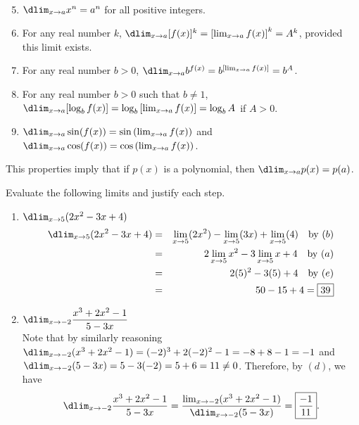 \documentclass{book}
\begin{document}
\begin{Thm}\mbox{}\\
\begin{enumerate}
\setcounter{enumi}{4}
\item $\dlim_{x\to a} x^n = a^n$ for all positive integers.\\ 


\item For any real number $k$, $\dlim_{x\to a}[f(x)]^k = \left[\lim_{x\to a}f(x)\right]^k = A^k$, provided this limit exists.\footnotemark\\

\item For any real number $b> 0$, $\dlim_{x\to a} b^{f(x)} = b^{\left[\lim_{x\to a} f(x)\right]} = b^A$.\\

\item For any real number $b> 0$ such that $b\neq 1$, $\dlim_{x\to a}[\log_b f(x)] = \log_b\left[\lim_{x\to a} f(x)\right] = \log_b A$ if $A> 0$.\\

\item $\dlim_{x\to a} \sin (f(x)) = \sin \left(\lim_{x\to a} f(x)\right)$ and $\dlim_{x\to a} \cos (f(x)) = \cos \left(\lim_{x\to a} f(x)\right)$.
\end{enumerate}
\end{Thm}\vs

This properties imply that if $p(x)$ is a polynomial, then $\dlim_{x\to a} p(x) = p(a)$. %

\begin{Exam} Evaluate the following limits and justify each step.
\begin{enumerate}
\item $\dlim_{x\to 5} (2x^2-3x+4)$
\begin{eqnarray*}
\dlim_{x\to 5} (2x^2-3x+4) &=& \lim_{x\to 5} (2x^2)- \lim_{x\to 5} (3x) +\lim_{x\to 5} (4) \quad \text{by } (b)\\
&=& 2\lim_{x\to 5} x^2 - 3\lim_{x\to 5} x + 4 \quad \text{by } (a)\\
&=& 2(5)^2-3(5)+4\quad \text{by } (e)\\
&=& 50 - 15+4 = \fbox{$39$}
\end{eqnarray*}

\item $\dlim_{x\to-2} \dfrac{x^3+2x^2-1}{5-3x}$\\
Note that by similarly reasoning $\dlim_{x\to -2} ( x^3+2x^2-1) = (-2)^3+2(-2)^2-1 = -8+8-1=-1$ and $\dlim_{x\to -2} (5-3x) = 5-3(-2) = 5+6=11\neq 0$. Therefore, by $(d)$, we have \[\dlim_{x\to-2} \dfrac{x^3+2x^2-1}{5-3x} = \dfrac{\lim_{x\to -2} ( x^3+2x^2-1) }{\dlim_{x\to -2} (5-3x) } = \fbox{$\dfrac{-1}{11}$}.\]
\end{enumerate}
\end{Exam}\vs
\end{document}

